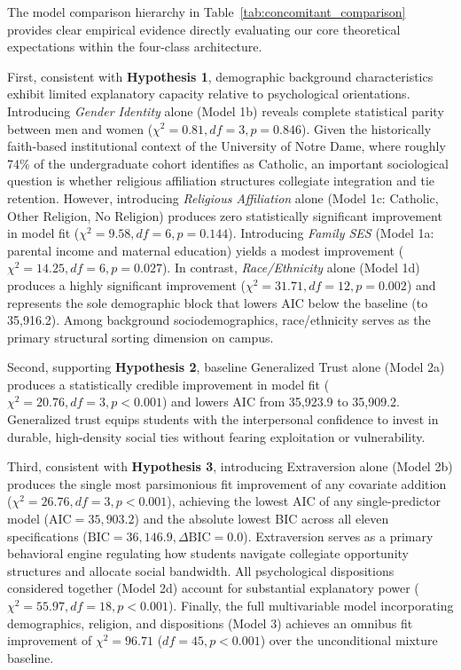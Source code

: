 \documentclass[12pt]{article}
\begin{document}
The model comparison hierarchy in Table~\ref{tab:concomitant_comparison} provides clear empirical evidence directly evaluating our core theoretical expectations within the four-class architecture. 

First, consistent with \textbf{Hypothesis 1}, demographic background characteristics exhibit limited explanatory capacity relative to psychological orientations. Introducing \textit{Gender Identity} alone (Model 1b) reveals complete statistical parity between men and women ($\chi^2 = 0.81, df = 3, p = 0.846$). Given the historically faith-based institutional context of the University of Notre Dame, where roughly 74\% of the undergraduate cohort identifies as Catholic, an important sociological question is whether religious affiliation structures collegiate integration and tie retention. However, introducing \textit{Religious Affiliation} alone (Model 1c: Catholic, Other Religion, No Religion) produces zero statistically significant improvement in model fit ($\chi^2 = 9.58, df = 6, p = 0.144$). Introducing \textit{Family SES} (Model 1a: parental income and maternal education) yields a modest improvement ($\chi^2 = 14.25, df = 6, p = 0.027$). In contrast, \textit{Race/Ethnicity} alone (Model 1d) produces a highly significant improvement ($\chi^2 = 31.71, df = 12, p = 0.002$) and represents the sole demographic block that lowers AIC below the baseline (to 35,916.2). Among background sociodemographics, race/ethnicity serves as the primary structural sorting dimension on campus.

Second, supporting \textbf{Hypothesis 2}, baseline Generalized Trust alone (Model 2a) produces a statistically credible improvement in model fit ($\chi^2 = 20.76, df = 3, p < 0.001$) and lowers AIC from 35,923.9 to 35,909.2. Generalized trust equips students with the interpersonal confidence to invest in durable, high-density social ties without fearing exploitation or vulnerability.

Third, consistent with \textbf{Hypothesis 3}, introducing Extraversion alone (Model 2b) produces the single most parsimonious fit improvement of any covariate addition ($\chi^2 = 26.76, df = 3, p < 0.001$), achieving the lowest AIC of any single-predictor model ($\text{AIC} = 35,903.2$) and the absolute lowest BIC across all eleven specifications ($\text{BIC} = 36,146.9, \Delta\text{BIC} = 0.0$). Extraversion serves as a primary behavioral engine regulating how students navigate collegiate opportunity structures and allocate social bandwidth. All psychological dispositions considered together (Model 2d) account for substantial explanatory power ($\chi^2 = 55.97, df = 18, p < 0.001$). Finally, the full multivariable model incorporating demographics, religion, and dispositions (Model 3) achieves an omnibus fit improvement of $\chi^2 = 96.71$ ($df = 45, p < 0.001$) over the unconditional mixture baseline.
\end{document}

